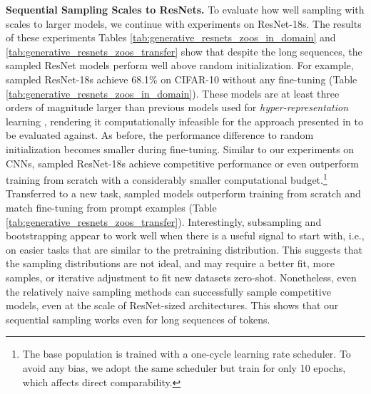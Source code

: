 \textbf{\ourmethod Sequential Sampling Scales to ResNets.}
To evaluate how well sampling with \ourmethod scales to larger models, we continue with experiments on ResNet-18s. 
The results of these experiments Tables \ref{tab:generative_resnets_zoos_in_domain} and \ref{tab:generative_resnets_zoos_transfer} show that despite the long sequences, the sampled ResNet models perform well above random initialization. 
For example, sampled ResNet-18s achieve 68.1\% on CIFAR-10 without any fine-tuning (Table \ref{tab:generative_resnets_zoos_in_domain}). 
These models are at least three orders of magnitude larger than previous models used for \textit{hyper-representation} learning \citep{schurholtHyperRepresentationsGenerativeModels2022}, rendering it computationally infeasible for the approach presented in \citep{schurholtHyperRepresentationsGenerativeModels2022} to be evaluated against.
As before, the performance difference to random initialization becomes smaller during fine-tuning. 
Similar to our experiments on CNNs, sampled ResNet-18s achieve competitive performance or even outperform training from scratch with a considerably smaller computational budget.\footnote{The base population is trained with a one-cycle learning rate scheduler. To avoid any bias, we adopt the same scheduler but train for only 10 epochs, which affects direct comparability.}
Transferred to a new task, sampled models outperform training from scratch and match fine-tuning from prompt examples (Table \ref{tab:generative_resnets_zoos_transfer}). Interestingly, subsampling and bootstrapping appear to work well when there is a useful signal to start with, i.e., on easier tasks that are similar to the pretraining distribution. This suggests that the sampling distributions are not ideal, and may require a better fit, more samples, or iterative adjustment to fit new datasets zero-shot.
Nonetheless, even the relatively naive sampling methods can successfully sample competitive models, even at the scale of ResNet-sized architectures. This shows that our sequential sampling works even for long sequences of tokens.  

